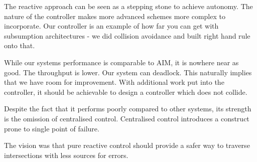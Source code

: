The reactive approach can be seen as a stepping stone to achieve autonomy.
The nature of the controller makes more advanced schemes more complex to incorporate.
Our controller is an example of how far you can get with subsumption architectures - we did collision avoidance and built right hand rule onto that.

While our systems performance is comparable to AIM, it is nowhere near as good.
The throughput is lower. Our system can deadlock.
This naturally implies that we have room for improvement.
With additional work put into the controller, it should be achievable to design a controller which does not collide.

Despite the fact that it performs poorly compared to other systems, its strength is the omission of centralised control. Centralised control introduces a construct prone to single point of failure.

The vision was that pure reactive control should provide a safer way to traverse intersections with less sources for errors.
